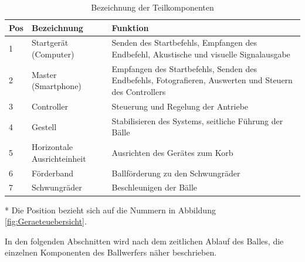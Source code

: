 \begin{table}[h!]
		\centering
	\begin{threeparttable} 
		\begin{tabular}{p{6mm}p{4.2cm}p{\textwidth-8cm}}
		    \textbf{Pos}\tnote{*} & \textbf{Bezeichnung} & \textbf{Funktion} \\ 
			\hline\rule{0pt}{11pt} 1 & Startgerät (Computer) & Senden des Startbefehls, Empfangen des Endbefehl, 
			Akustische und visuelle Signalausgabe \\ 
			    \rule{0pt}{11pt}   2 & Master  (Smartphone) & Empfangen des Startbefehls, Senden des Endbefehls,
			Fotografieren, Auswerten und Steuern des Controllers \\ 
			  \rule{0pt}{11pt}     3 & Controller & Steuerung und Regelung der Antriebe \\ 
			  \rule{0pt}{11pt}     4 & Gestell & Stabilisieren des Systems,	seitliche Führung der Bälle \\ 
			   \rule{0pt}{11pt}    5 & Horizontale Ausrichteinheit & Ausrichten des Gerätes zum Korb \\ 
			   \rule{0pt}{11pt}    6 & Förderband & Ballförderung zu den Schwungräder \\ 
			   \rule{0pt}{11pt}    7 & Schwungräder & Beschleunigen der Bälle \\ 
		\end{tabular}
		\caption{Bezeichnung der Teilkomponenten}	
		\label{tab:BezTeilkomponenten}
		\begin{tablenotes}\footnotesize 
			\item[*] Die Position bezieht sich auf die Nummern in Abbildung \ref{fig:Geraeteuebersicht}.
		\end{tablenotes}
	\end{threeparttable} 
\end{table}
\noindent In den folgenden Abschnitten wird nach dem zeitlichen Ablauf des Balles, 
die einzelnen Komponenten des Ballwerfers näher beschrieben. 